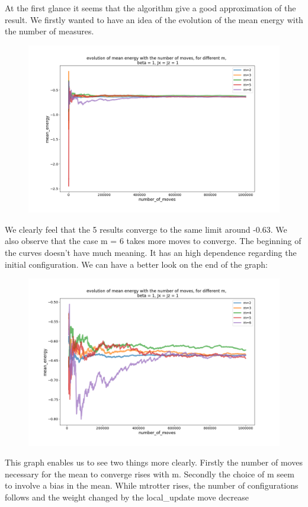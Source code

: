 \documentclass[a4paper,12pt,twoside]{article}
\begin{document}
	 At the first glance it seems that the algorithm give a good approximation of the result. We firstly wanted to have an idea of the evolution of the mean energy with the number of measures.
	 \begin{figure}[!h]
			 	\centering
			 	
			 	\includegraphics[scale=0.4]{meanenrgyevolution_x=z=1_m2-6.png}
			 	
			 	
			 	\label{energy mean evolution}			
	 \end{figure}
	 
	 We clearly feel that the 5 results converge to the same limit around -0.63. We also observe that the case m = 6 takes more moves to converge.
	 The beginning of the curves doesn't have much meaning. It has an high dependence regarding the initial configuration.
	 We can have a better look on the end of the graph:
	 
	 \begin{figure}[H]
			 	\centering
			 	\includegraphics[scale=0.4]{mean_energy_evolution_centerd_x=z=1_m2-6.png}
			 	\label{energy mean evolution}			
	 \end{figure}
	 This graph enables us to see two things more clearly.  Firstly the number of moves necessary for the mean to converge rises with m. Secondly the choice of m seem to involve a bias in the mean.
	 While mtrotter rises, the number of configurations follows and the weight changed by the local\_update move decrease
	 
\end{document}
